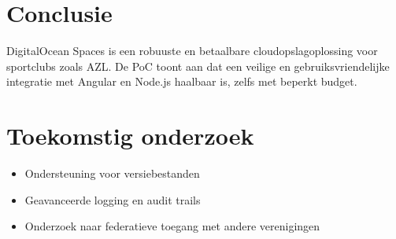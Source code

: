 \documentclass[a0,portrait]{hogent-poster}
\begin{document}
\begin{multicols}{2}
\section{Conclusie}
DigitalOcean Spaces is een robuuste en betaalbare cloudopslagoplossing voor sportclubs zoals AZL. De PoC toont aan dat een veilige en gebruiksvriendelijke integratie met Angular en Node.js haalbaar is, zelfs met beperkt budget.

\section{Toekomstig onderzoek}
\begin{itemize}
  \item Ondersteuning voor versiebestanden
  \item Geavanceerde logging en audit trails
  \item Onderzoek naar federatieve toegang met andere verenigingen
\end{itemize}

\end{multicols}
\end{document}
